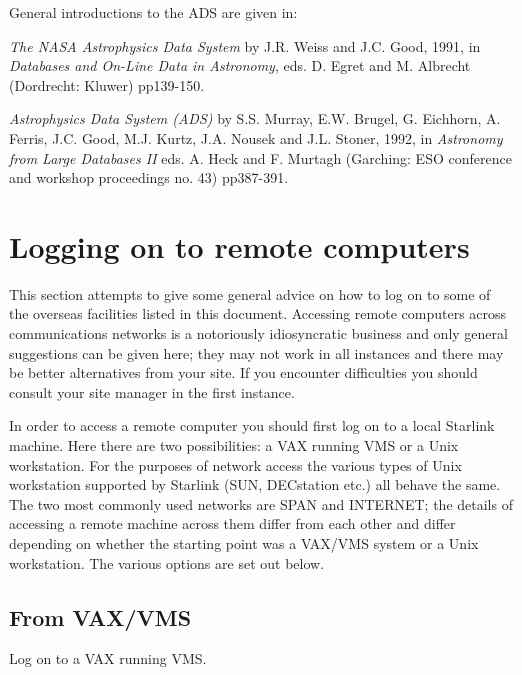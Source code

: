 \documentclass[twoside,11pt,nolof]{starlink}
\begin{document}
General introductions to the ADS are given in:

 \textit{The NASA Astrophysics Data System} by J.R. Weiss and J.C. Good,
1991, in \textit{Databases and On-Line Data in Astronomy}, eds. D. Egret
and M. Albrecht (Dordrecht: Kluwer) pp139-150.

\textit{Astrophysics Data System (ADS)} by S.S. Murray, E.W. Brugel, G.
Eichhorn, A. Ferris, J.C. Good, M.J. Kurtz, J.A. Nousek and J.L. Stoner,
1992, in \textit{Astronomy from Large Databases II} eds. A. Heck and F.
Murtagh (Garching: ESO conference and workshop proceedings no. 43)
pp387-391.

\section{Logging on to remote computers
\label{REMOTE}}

This section attempts to give some general advice on how to log on to
some of the overseas facilities listed in this document. Accessing
remote computers across communications networks is a notoriously
idiosyncratic business and only general suggestions can be given here;
they may not work in all instances and there may be better alternatives
from your site. If you encounter difficulties you should consult your
site manager in the first instance.

In order to access a remote computer you should first log on to a local
Starlink machine. Here there are two possibilities: a VAX running VMS
or a Unix workstation. For the purposes of network access the various
types of Unix workstation supported by Starlink (SUN, DECstation etc.)
all behave the same. The two most commonly used networks are SPAN and
INTERNET; the details of accessing a remote machine across them differ
from each other and differ depending on whether the starting point was
a VAX/VMS system or a Unix workstation. The various options are set out
below.

\subsection{From VAX/VMS}

Log on to a VAX running VMS.
\end{document}
